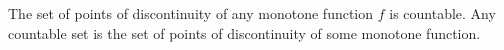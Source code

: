 The set of points of discontinuity of any monotone function $f$ is countable. Any countable set is the set of points of discontinuity of some monotone function.
